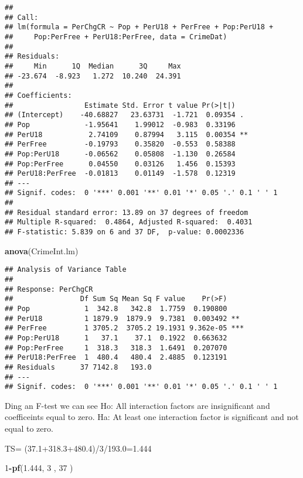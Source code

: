 \documentclass[]{article}
\newenvironment{Shaded}{\begin{snugshade}}{\end{snugshade}}
\newcommand{\KeywordTok}[1]{\textcolor[rgb]{0.13,0.29,0.53}{\textbf{#1}}}
\newcommand{\DecValTok}[1]{\textcolor[rgb]{0.00,0.00,0.81}{#1}}
\newcommand{\FloatTok}[1]{\textcolor[rgb]{0.00,0.00,0.81}{#1}}
\newcommand{\OperatorTok}[1]{\textcolor[rgb]{0.81,0.36,0.00}{\textbf{#1}}}
\newcommand{\NormalTok}[1]{#1}
\begin{document}
\begin{verbatim}
## 
## Call:
## lm(formula = PerChgCR ~ Pop + PerU18 + PerFree + Pop:PerU18 + 
##     Pop:PerFree + PerU18:PerFree, data = CrimeDat)
## 
## Residuals:
##     Min      1Q  Median      3Q     Max 
## -23.674  -8.923   1.272  10.240  24.391 
## 
## Coefficients:
##                 Estimate Std. Error t value Pr(>|t|)   
## (Intercept)    -40.68827   23.63731  -1.721  0.09354 . 
## Pop             -1.95641    1.99012  -0.983  0.33196   
## PerU18           2.74109    0.87994   3.115  0.00354 **
## PerFree         -0.19793    0.35820  -0.553  0.58388   
## Pop:PerU18      -0.06562    0.05808  -1.130  0.26584   
## Pop:PerFree      0.04550    0.03126   1.456  0.15393   
## PerU18:PerFree  -0.01813    0.01149  -1.578  0.12319   
## ---
## Signif. codes:  0 '***' 0.001 '**' 0.01 '*' 0.05 '.' 0.1 ' ' 1
## 
## Residual standard error: 13.89 on 37 degrees of freedom
## Multiple R-squared:  0.4864, Adjusted R-squared:  0.4031 
## F-statistic: 5.839 on 6 and 37 DF,  p-value: 0.0002336
\end{verbatim}

\begin{Shaded}
\begin{Highlighting}[]
\KeywordTok{anova}\NormalTok{(CrimeInt.lm)}
\end{Highlighting}
\end{Shaded}

\begin{verbatim}
## Analysis of Variance Table
## 
## Response: PerChgCR
##                Df Sum Sq Mean Sq F value    Pr(>F)    
## Pop             1  342.8   342.8  1.7759  0.190800    
## PerU18          1 1879.9  1879.9  9.7381  0.003492 ** 
## PerFree         1 3705.2  3705.2 19.1931 9.362e-05 ***
## Pop:PerU18      1   37.1    37.1  0.1922  0.663632    
## Pop:PerFree     1  318.3   318.3  1.6491  0.207070    
## PerU18:PerFree  1  480.4   480.4  2.4885  0.123191    
## Residuals      37 7142.8   193.0                      
## ---
## Signif. codes:  0 '***' 0.001 '**' 0.01 '*' 0.05 '.' 0.1 ' ' 1
\end{verbatim}

Ding an F-test we can see Ho: All interaction factors are insignificant
and coefficeints equal to zero. Ha: At least one interaction factor is
significant and not equal to zero.

TS= (37.1+318.3+480.4)/3/193.0=1.444

\begin{Shaded}
\begin{Highlighting}[]
\DecValTok{1}\OperatorTok{-}\KeywordTok{pf}\NormalTok{(}\FloatTok{1.444}\NormalTok{, }\DecValTok{3}\NormalTok{ , }\DecValTok{37}\NormalTok{ )}
\end{Highlighting}
\end{Shaded}
\end{document}
